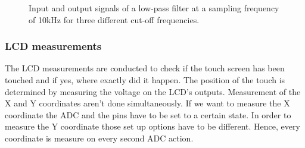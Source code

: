 \begin{figure}[!h]
  \centering
  \caption{Input and output signals of a low-pass filter at a sampling frequency of 10kHz for three different cut-off frequencies.}
  \label{fig:filter}
\end{figure}




\subsubsection{LCD measurements}
The LCD measurements are conducted to check if the touch screen has been touched and if yes, where exactly did it happen. The position of the touch is determined by measuring the voltage on the LCD's outputs. Measurement of the X and Y coordinates aren't done simultaneously. If we want to measure the X coordinate the ADC and the pins have to be set to a certain state. In order to measure the Y coordinate those set up options have to be different. Hence, every coordinate is measure on every second ADC action.

 
